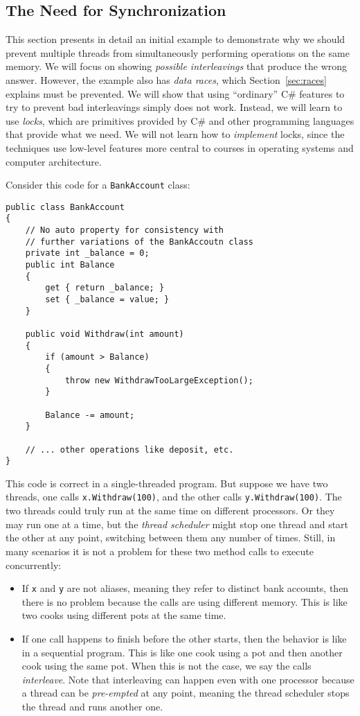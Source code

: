 \documentclass[10pt]{article}
\begin{document}
\subsection{The Need for Synchronization}

This section presents in detail an initial example to demonstrate why
we should prevent multiple threads from simultaneously performing
operations on the same memory.  We will focus on showing
\emph{possible interleavings} that produce the wrong answer.  However,
the example also has \emph{data races}, which Section~\ref{sec:races}
explains must be prevented.  We will show that using ``ordinary'' C\#
features to try to prevent bad interleavings simply does not work.
Instead, we will learn to use \emph{locks}, which are primitives
provided by C\# and other programming languages that provide what
we need.  We will not learn how to \emph{implement} locks, since the
techniques use low-level features more central to courses in operating
systems and computer architecture.

Consider this code for a {\tt BankAccount} class:
\begin{verbatim}
public class BankAccount
{
    // No auto property for consistency with
    // further variations of the BankAccoutn class
    private int _balance = 0;
    public int Balance
    {
        get { return _balance; }
        set { _balance = value; }
    }

    public void Withdraw(int amount)
    {
        if (amount > Balance)
        {
            throw new WithdrawTooLargeException();
        }

        Balance -= amount;
    }

    // ... other operations like deposit, etc.
}
\end{verbatim}

This code is correct in a single-threaded program.  But suppose we
have two threads, one calls {\tt x.Withdraw(100)}, and the other calls
{\tt y.Withdraw(100)}.  The two threads could truly run at the same
time on different processors.  Or they may run one at a time, but the
\emph{thread scheduler} might stop one thread and start the other at
any point, switching between them any number of times.  Still, in many
scenarios it is not a problem for these two method calls to execute concurrently:
\begin{itemize}
\item If {\tt x} and {\tt y} are not aliases, meaning they refer to
  distinct bank accounts, then there is no problem because the calls
  are using different memory.  This is like two cooks using different
  pots at the same time.
\item If one call happens to finish before the other starts, then the behavior
  is like in a sequential program.  This is like one cook using a pot
  and then another cook using the same pot.  When this is not the
  case, we say the calls \emph{interleave}.  Note that interleaving
  can happen even with one processor because a thread can be
  \emph{pre-empted} at any point, meaning the thread scheduler stops
  the thread and runs another one.
\end{itemize}
\end{document}
